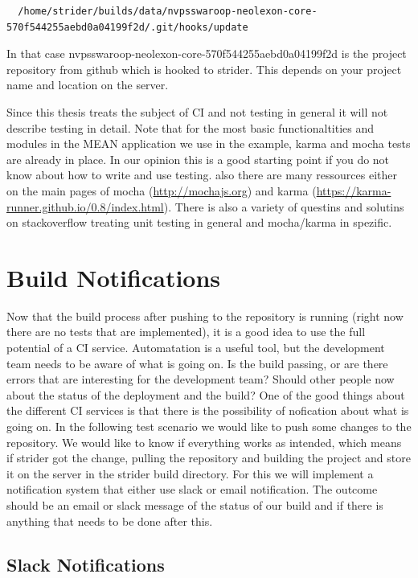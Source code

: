 \begin{lstlisting}
  /home/strider/builds/data/nvpsswaroop-neolexon-core-570f544255aebd0a04199f2d/.git/hooks/update
\end{lstlisting}

In that case nvpsswaroop-neolexon-core-570f544255aebd0a04199f2d is the project repository from github which is hooked to strider.
This depends on your project name and location on the server.

Since this thesis treats the subject of CI and not testing in general it will not describe testing in detail. Note that for the
most basic functionaltities and modules in the MEAN application we use in the example, karma and mocha tests are already in place.
In our opinion this is a good starting point if you do not know about how to write and use testing. also there are many ressources
either on the main pages of mocha (\url{http://mochajs.org}) and karma (\url{https://karma-runner.github.io/0.8/index.html}). There
is also a variety of questins and solutins on stackoverflow treating unit testing in general and mocha/karma in spezific.

\newpage
\section{Build Notifications}
\label{section:Build Notifications}
Now that the build process after pushing to the repository is running (right now there are no tests that are implemented), it is a
good idea to use the full potential of a CI service. Automatation is a useful tool, but the development team needs to be aware of
what is going on. Is the build passing, or are there errors that are interesting for the development team? Should other people
now about the status of the deployment and the build? One of the good things about the different CI services is that there is the
possibility of nofication about what is going on. In the following test scenario we would like to push some changes to the repository.
We would like to know if everything works as intended, which means if strider got the change, pulling the repository and building the
project and store it on the server in the strider build directory. For this we will implement a notification system that either use
slack or email notification. The outcome should be an email or slack message of the status of our build and if there is anything that
needs to be done after this.

\subsection{Slack Notifications}



